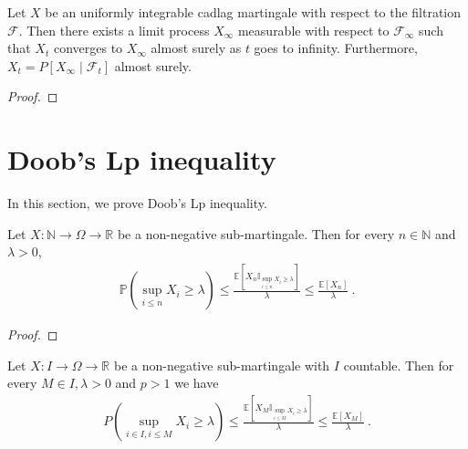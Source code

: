 \begin{theorem}\label{thm:tendsto_limitProcess_of_cadlag}
  \notready
Let $X$ be an uniformly integrable cadlag martingale with respect to the filtration $\mathcal{F}$.
Then there exists a limit process $X_\infty$ measurable with respect to $\mathcal{F}_\infty$ such that $X_t$ converges to $X_\infty$ almost surely as $t$ goes to infinity.
Furthermore, $X_t = P[X_\infty \mid \mathcal{F}_t]$ almost surely.
\end{theorem}

\begin{proof}

\end{proof}





\section{Doob's Lp inequality}

In this section, we prove Doob's Lp inequality.


\begin{lemma}\label{lem:maximal_ineq}
  \mathlibok
Let $X : \mathbb{N} \rightarrow \Omega \rightarrow \mathbb{R}$ be a non-negative sub-martingale.
Then for every $n \in \mathbb{N}$ and $\lambda > 0$,
\begin{align*}
  \mathbb{P}\left(\sup_{i \le n}X_i\geq\lambda \right)
  \le \frac{\mathbb{E}\left[X_n \mathbb{I}_{\sup_{i \le n}X_i \ge \lambda}\right]}{\lambda}
  \le \frac{\mathbb{E}[X_n]}{\lambda}
  \: .
\end{align*}
\end{lemma}

\begin{proof}
\end{proof}


\begin{lemma}\label{lem:doob_countable}
  Let $X : I \rightarrow \Omega \rightarrow \mathbb{R}$ be a non-negative sub-martingale with $I$ countable.
  Then for every $M \in I,\lambda > 0$ and $p>1$ we have
  \begin{align*}
    P\left( \sup_{i\in I, i\leq M}X_i\geq\lambda \right)
    \le \frac{\mathbb{E}\left[X_M \mathbb{I}_{\sup_{i \le M}X_i \ge \lambda}\right]}{\lambda}
    \le \frac{\mathbb{E}[X_M]}{\lambda}
    \: .
  \end{align*}
\end{lemma}

